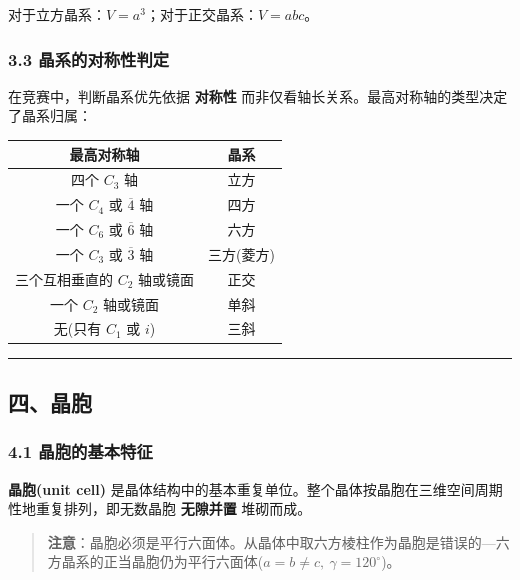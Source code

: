 对于立方晶系：\(V = a^3\)；对于正交晶系：\(V = abc\)。

\subsubsection{3.3 晶系的对称性判定}\label{ux6676ux7cfbux7684ux5bf9ux79f0ux6027ux5224ux5b9a}

在竞赛中，判断晶系优先依据 \textbf{对称性} 而非仅看轴长关系。最高对称轴的类型决定了晶系归属：

{\def\LTcaptype{none} %
\begin{longtable}[]{@{}cc@{}}
\toprule\noalign{}
最高对称轴 & 晶系 \\
\midrule\noalign{}
\endhead
\bottomrule\noalign{}
\endlastfoot
四个 \(C_3\) 轴 & 立方 \\
一个 \(C_4\) 或 \(\overline{4}\) 轴 & 四方 \\
一个 \(C_6\) 或 \(\overline{6}\) 轴 & 六方 \\
一个 \(C_3\) 或 \(\overline{3}\) 轴 & 三方(菱方) \\
三个互相垂直的 \(C_2\) 轴或镜面 & 正交 \\
一个 \(C_2\) 轴或镜面 & 单斜 \\
无(只有 \(C_1\) 或 \(i\)) & 三斜 \\
\end{longtable}
}

\begin{center}\rule{0.5\linewidth}{0.5pt}\end{center}

\subsection{四、晶胞}\label{ux56dbux6676ux80de}

\subsubsection{4.1 晶胞的基本特征}\label{ux6676ux80deux7684ux57faux672cux7279ux5f81}

\textbf{晶胞(unit cell)} 是晶体结构中的基本重复单位。整个晶体按晶胞在三维空间周期性地重复排列，即无数晶胞 \textbf{无隙并置} 堆砌而成。

\begin{quote}
\textbf{注意}：晶胞必须是平行六面体。从晶体中取六方棱柱作为晶胞是错误的---六方晶系的正当晶胞仍为平行六面体(\(a = b \neq c,\ \gamma = 120^\circ\))。
\end{quote}

